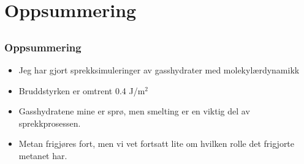 \documentclass[utf8x, notes, graphics]{beamer}
\begin{document}
\section{Oppsummering}
\subsection{}
\begin{frame}
\frametitle{Oppsummering}
\begin{itemize}
\item Jeg har gjort sprekksimuleringer av gasshydrater med molekylærdynamikk
\item Bruddstyrken er omtrent 0.4 J/m$^2$
\item Gasshydratene mine er sprø, men smelting er en viktig del av sprekkprosessen.
\item Metan frigjøres fort, men vi vet fortsatt lite om hvilken rolle det frigjorte metanet har.
\end{itemize}
\end{frame}
\end{document}
